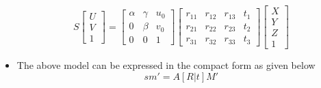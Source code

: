 \begin{itemize}
                                            $$ S\begin{bmatrix} U\\ V \\ 1 \end{bmatrix}=  
                                                \begin{bmatrix} \alpha & \gamma & u_0 \\ 
                                                                0 & \beta & v_0       \\ 
                                                                0 & 0& 1
                                                \end{bmatrix}
                                                \begin{bmatrix} r_{11} & r_{12} & r_{13} & t_1 \\
                                                                r_{21} & r_{22} & r_{23} & t_2 \\ 
                                                                r_{31} & r_{32} & r_{33} & t_3 
                                                \end{bmatrix}  
                                                \begin{bmatrix} X\\ Y \\ Z \\ 1 \end{bmatrix}
                                            $$
         
            \item   The above model can be expressed in the compact form as given below
                    $$sm'=A[R|t]M'$$
                    

\end{itemize}
